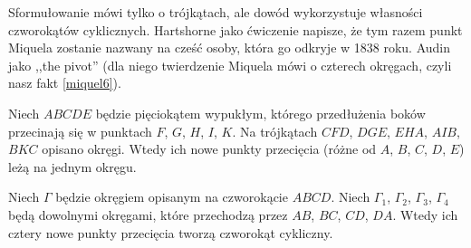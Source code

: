 Sformułowanie mówi tylko o trójkątach, ale dowód wykorzystuje własności czworokątów cyklicznych.
Hartshorne jako ćwiczenie \cite[s. 61]{hartshorne2000} napisze, że tym razem punkt Miquela zostanie nazwany na cześć osoby, która go odkryje w 1838 roku.
%
Audin \cite[s. 104]{audin_2003} jako ,,the pivot'' (dla niego twierdzenie Miquela mówi o czterech okręgach, czyli nasz fakt \ref{miquel6}).

\begin{proposition}
	Niech $ABCDE$ będzie pięciokątem wypukłym, którego przedłużenia boków przecinają się w punktach $F$, $G$, $H$, $I$, $K$.
	Na trójkątach $CFD$, $DGE$, $EHA$, $AIB$, $BKC$ opisano okręgi.
	Wtedy ich nowe punkty przecięcia (różne od $A$, $B$, $C$, $D$, $E$) leżą na jednym okręgu. 
\end{proposition}


\begin{proposition}
\label{miquel6}%
	Niech $\Gamma$ będzie okręgiem opisanym na czworokącie $ABCD$.
	Niech $\Gamma_1$, $\Gamma_2$, $\Gamma_3$, $\Gamma_4$ będą dowolnymi okręgami, które przechodzą przez $AB$, $BC$, $CD$, $DA$.
	Wtedy ich cztery nowe punkty przecięcia tworzą czworokąt cykliczny.
\end{proposition}

%